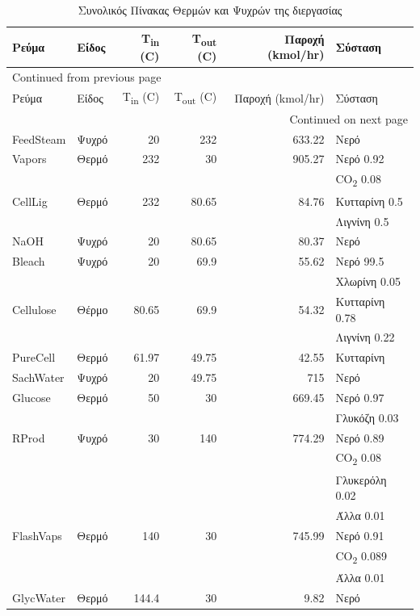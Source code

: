 \documentclass[11pt]{article}
\begin{document}
\begin{longtable}{llrrrl}
\caption{Συνολικός Πίνακας Θερμών και Ψυχρών της διεργασίας}
\\
\hline
Ρεύμα & Είδος & Τ\textsubscript{in} (C) & Τ\textsubscript{out} (C) & Παροχή (kmol/hr) & Σύσταση\\
\hline
\endfirsthead
\multicolumn{6}{l}{Continued from previous page} \\
\hline

Ρεύμα & Είδος & Τ\textsubscript{in} (C) & Τ\textsubscript{out} (C) & Παροχή (kmol/hr) & Σύσταση \\

\hline
\endhead
\hline\multicolumn{6}{r}{Continued on next page} \\
\endfoot
\endlastfoot
\hline
FeedSteam & Ψυχρό & 20 & 232 & 633.22 & Νερό\\
\hline
Vapors & Θερμό & 232 & 30 & 905.27 & Νερό 0.92\\
 &  &  &  &  & CO\textsubscript{2} 0.08\\
\hline
CellLig & Θερμό & 232 & 80.65 & 84.76 & Κυτταρίνη 0.5\\
 &  &  &  &  & Λιγνίνη 0.5\\
\hline
NaOH & Ψυχρό & 20 & 80.65 & 80.37 & Νερό\\
\hline
Bleach & Ψυχρό & 20 & 69.9 & 55.62 & Νερό 99.5\\
 &  &  &  &  & Χλωρίνη 0.05\\
\hline
Cellulose & Θέρμο & 80.65 & 69.9 & 54.32 & Κυτταρίνη 0.78\\
 &  &  &  &  & Λιγνίνη 0.22\\
\hline
PureCell & Θερμό & 61.97 & 49.75 & 42.55 & Κυτταρίνη\\
\hline
SachWater & Ψυχρό & 20 & 49.75 & 715 & Νερό\\
\hline
Glucose & Θερμό & 50 & 30 & 669.45 & Νερό 0.97\\
 &  &  &  &  & Γλυκόζη 0.03\\
\hline
RProd & Ψυχρό & 30 & 140 & 774.29 & Νερό 0.89\\
 &  &  &  &  & CO\textsubscript{2} 0.08\\
 &  &  &  &  & Γλυκερόλη 0.02\\
 &  &  &  &  & Άλλα 0.01\\
\hline
FlashVaps & Θερμό & 140 & 30 & 745.99 & Νερό 0.91\\
 &  &  &  &  & CO\textsubscript{2} 0.089\\
 &  &  &  &  & Άλλα 0.01\\
\hline
GlycWater & Θερμό & 144.4 & 30 & 9.82 & Νερό\\

\end{longtable}
\end{document}
